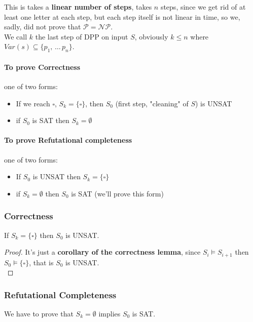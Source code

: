 This is takes a \textbf{linear number of steps}, takes $n$ steps, since we get rid of at least one letter at each step, but each step itself is not linear in time, so we, sadly, did not prove that $\mathcal{P} = \mathcal{NP}$.\\

We call $k$ the last step of DPP on input $S$, obviously $k \leq n$ where $Var(s) \subseteq \{p_1 , \, \dots \, p_n\}$.\\

\paragraph{To prove Correctness} one of two forms: 
\begin{itemize}
	\item If we reach $\square$, $S_k = \{\square\}$, then $S_0$ (first step, "cleaning" of $S$) is UNSAT
	\item if $S_0$ is SAT then $S_k = \emptyset$
\end{itemize}


\paragraph{To prove Refutational completeness} one of two forms: 
\begin{itemize}
	\item If $S_0$ is UNSAT then $S_k = \{\square\}$
	\item if $S_k = \emptyset$ then $S_0$ is SAT (we'll prove this form)
\end{itemize}

\nn

\subsubsection{Correctness}
If $S_k = \{\square\}$ then $S_0$ is UNSAT.\\

\begin{proof}
	It's just a \textbf{corollary of the correctness lemma}, since $S_i \models S_{i+1}$ then $S_0 \models \{\square\}$, that is $S_0$ is UNSAT.\\ 
\end{proof}

\newpage

\subsubsection{Refutational Completeness}
We have to prove that $S_k = \emptyset$ implies $S_0$ is SAT.\\

